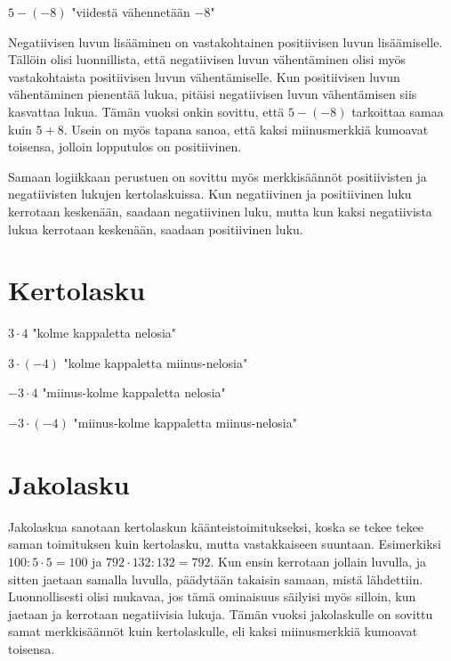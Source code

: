 $5-(-8)$ "viidestä vähennetään $-8$"

Negatiivisen luvun lisääminen on vastakohtainen positiivisen luvun lisäämiselle. Tällöin olisi luonnillista, että negatiivisen luvun vähentäminen olisi myös vastakohtaista positiivisen luvun vähentämiselle. Kun positiivisen luvun vähentäminen pienentää lukua, pitäisi negatiivisen luvun vähentämisen siis kasvattaa lukua. Tämän vuoksi onkin sovittu, että $5-(-8)$ tarkoittaa samaa kuin $5+8$. Usein on myös tapana sanoa, että kaksi miinusmerkkiä kumoavat toisensa, jolloin lopputulos on positiivinen.


Samaan logiikkaan perustuen on sovittu myös merkkisäännöt positiivisten ja negatiivisten lukujen kertolaskuissa. Kun negatiivinen ja positiivinen luku kerrotaan keskenään, saadaan negatiivinen luku, mutta kun kaksi negatiivista lukua kerrotaan keskenään, saadaan positiivinen luku.

\section{Kertolasku}

$3 \cdot 4$ "kolme kappaletta nelosia"


$3 \cdot (-4)$ "kolme kappaletta miinus-nelosia"


$-3 \cdot 4$ "miinus-kolme kappaletta nelosia"


$-3 \cdot (-4)$ "miinus-kolme kappaletta miinus-nelosia"


\section{Jakolasku}

Jakolaskua sanotaan kertolaskun käänteistoimitukseksi, koska se tekee tekee saman toimituksen kuin kertolasku, mutta vastakkaiseen suuntaan. Esimerkiksi $100:5\cdot 5=100$ ja $792\cdot 132:132=792$. Kun ensin kerrotaan jollain luvulla, ja sitten jaetaan samalla luvulla, päädytään takaisin samaan, mistä lähdettiin. Luonnollisesti olisi mukavaa, jos tämä ominaisuus säilyisi myös silloin, kun jaetaan ja kerrotaan negatiivisia lukuja. Tämän vuoksi jakolaskulle on sovittu samat merkkisäännöt kuin kertolaskulle, eli kaksi miinusmerkkiä kumoavat toisensa.

